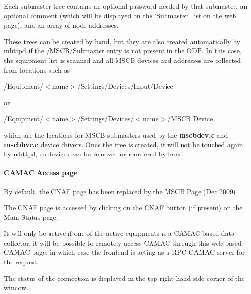 Each submaster tree contains an optional password needed by that submaster, an optional comment (which will be displayed on the 'Submaster' list on the web page), and an array of node addresses.\par
 \par
 These trees can be created by hand, but they are also created automatically by mhttpd if the /MSCB/Submaster entry is not present in the ODB. In this case, the equipment list is scanned and all MSCB devices and addresses are collected from locations such as \par
 /Equipment/$<$name$>$/Settings/Devices/Input/Device\par


or \par
 /Equipment/$<$name$>$/Settings/Devices/$<$name$>$/MSCB Device\par
 which are the locations for MSCB submasters used by the {\bfseries mscbdev.c} and {\bfseries mscbhvr.c} device drivers. Once the tree is created, it will not be touched again by mhttpd, so devices can be removed or reordered by hand.\par
 \par


\label{index_end}
\hypertarget{index_end}{}
  \paragraph{CAMAC Access page}\label{RC_mhttpd_CNAF_page}
\label{RC_mhttpd_CNAF_page_idx_mhttpd_page_CNAF}
\hypertarget{RC_mhttpd_CNAF_page_idx_mhttpd_page_CNAF}{}
 \par




\par
  By default, the CNAF page has been replaced by the MSCB Page (\hyperlink{NDF_ndf_dec_2009}{Dec 2009}) 

\par
 The CNAF page is accessed by clicking on the \hyperlink{RC_mhttpd_status_page_features_RC_mhttpd_status_menu_buttons}{CNAF button} (\hyperlink{RC_mhttpd_status_page_features_RC_mhttpd_status_menu_buttons}{if present}) on the Main Status page. \par
 It will only be active if one of the active equipments is a CAMAC-\/based data collector, it will be possible to remotely access CAMAC through this web-\/based CAMAC page, in which case the frontend is acting as a RPC CAMAC server for the request. \par
 The status of the connection is displayed in the top right hand side corner of the window.

